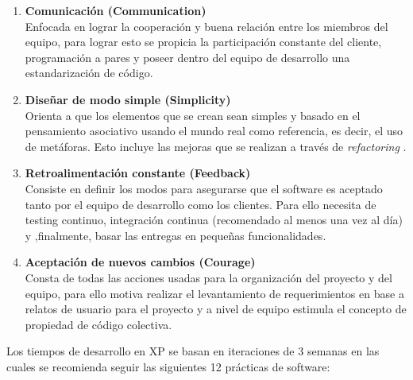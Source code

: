 \begin{enumerate}
  \item \textbf{Comunicación (Communication)}\mbox{}\\ Enfocada en lograr la cooperación y buena relación entre los miembros del equipo, para lograr esto se propicia la participación constante del cliente, programación a pares y poseer dentro del equipo de desarrollo una estandarización de código.

  \item \textbf{Diseñar de modo simple (Simplicity)} \mbox{}\\ Orienta a que los elementos que se crean sean simples y basado en el pensamiento asociativo usando el mundo real como referencia, es decir, el uso de metáforas. Esto incluye las mejoras que se realizan a través de \textit{refactoring} .

  \item \textbf{Retroalimentación constante (Feedback)} \mbox{}\\ Consiste en definir los modos para asegurarse que el software es aceptado tanto por el equipo de desarrollo como los clientes. Para ello necesita de testing continuo, integración continua (recomendado al menos una vez al día) y ,finalmente, basar las entregas en pequeñas funcionalidades.

  \item \textbf{Aceptación de nuevos cambios (Courage)} \mbox{}\\ Consta de todas las acciones usadas para la organización del proyecto y del equipo, para ello motiva realizar el levantamiento de requerimientos en base a relatos de usuario para el proyecto y a nivel de equipo estimula el concepto de propiedad de código colectiva.
\end{enumerate}

Los tiempos de desarrollo en XP se basan en iteraciones de 3 semanas en las cuales se recomienda seguir las siguientes 12 prácticas de software:


